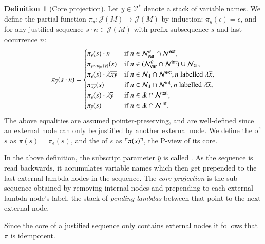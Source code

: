 \documentclass{elsarticle}
\makeatletter
\theoremstyle{plain}
\theoremstyle{definition}
\newtheorem{definition}{Definition}[section]
\theoremstyle{remark}
\newcommand\VarSet{\mathcal{V}}
\newcommand\Nodes{\mathcal{N}}%
\newcommand\NodesVar{\Nodes_{\sf var}}%
\newcommand\NodesLmd{\Nodes_\lambda}%
\newcommand\NodesApp{\Nodes_@}%
\newcommand{\ghostlmd}{{\lambda\!\!\lambda}}
\newcommand{\ghostvar}{\theta}
\newcommand\ImNodesVar{\NodesVar^\ghostvar}
\def\coresymbol{\pi} %
\newcommand{\core}[1]{\coresymbol(#1)} %
\newcommand{\ExtNodes}{\Nodes^{\sf ext}}
\newcommand{\IntNodes}{\Nodes^{\sf int}}
\def\justseqset{\mathcal{J}}
\makeatother
\begin{document}
\begin{definition}[Core projection]
\label{def:coreprojection}
Let $\overline{y} \in \VarSet^*$ denote a stack of variable names.
We define the partial function $\coresymbol_{\overline{y}}\colon \justseqset(M) \longrightarrow \justseqset(M)$ by induction: $\coresymbol_{\overline{y}}(\epsilon) = \epsilon$, and for any justified sequence $s \cdot n\in\justseqset(M)$ with prefix subsequence $s$ and last occurrence $n$:
\begin{equation*}
\coresymbol_{\overline{y}}(s\cdot n) =
\begin{cases}
\coresymbol_{\epsilon}(s) \cdot n
    & \mbox{if } n\in\ImNodesVar\inter\ExtNodes, \\
\coresymbol_{pop_{|n|}(\overline{y})}(s)
    & \mbox{if } n\in(\ImNodesVar\inter\IntNodes)\union\NodesApp, \\
\coresymbol_{\epsilon}(s) \cdot \lambda \overline{x}\overline{y}
    & \mbox{if } n\in\NodesLmd\inter\ExtNodes, n \mbox{ labelled } \lambda\overline{x},\\
\coresymbol_{\overline{x} \overline{y}}(s)
    & \mbox{if } n\in\NodesLmd\inter\IntNodes, n \mbox{ labelled } \lambda\overline{x}, \\
\coresymbol_{\epsilon}(s) \cdot\lambda\overline{y}
    & \mbox{if } n\in\ghostlmd\inter\ExtNodes, \\
\coresymbol_{\overline{y}}(s)
    & \mbox{if } n\in\ghostlmd\inter\IntNodes.
\end{cases}
\end{equation*}
The above equalities are assumed pointer-preserving, and are well-defined since an external node can only be justified by another external node. We define
the  of $s$ as $\core{s} = \coresymbol_\epsilon(s)$,
and the  of $s$ as $\pview{\core{s}}$, the P-view of its core.
\end{definition}

In the above definition, the subscript parameter $\overline{y}$ is called . As the sequence is read backwards, it accumulates variable names which then get prepended to the last external lambda nodes in the sequence. The \emph{core projection} is the sub-sequence obtained by removing internal nodes and prepending to each external lambda node's label, the stack of \emph{pending lambdas} between that point to the next external node.

Since the core of a justified sequence only contains external nodes it follows that $\coresymbol$ is idempotent.
\end{document}
